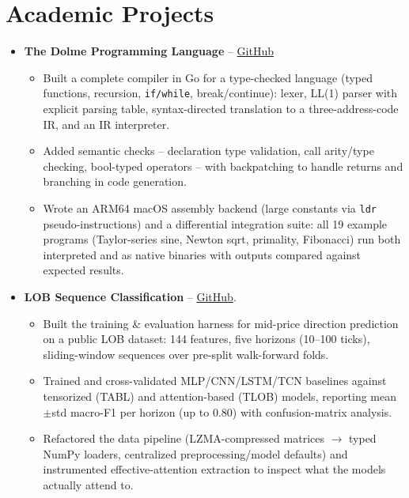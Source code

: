 \documentclass[12pt,a4paper]{article}
\begin{document}
\section{Academic Projects}
\begin{itemize}[label=\tiny$\bullet$, leftmargin=1em, itemsep=6pt]
    \item \textbf{The Dolme Programming Language}  -- \href{https://github.com/uidops/dolme}{GitHub}
    \begin{itemize}[label=--, topsep=1pt]
        \item Built a complete compiler in Go for a type-checked language (typed
            functions, recursion, \texttt{if/while}, break/continue): lexer, LL(1)
            parser with explicit parsing table, syntax-directed translation to a
            three-address-code IR, and an IR interpreter.
        \item Added semantic checks -- declaration type validation, call
            arity/type checking, bool-typed operators -- with backpatching to handle
            returns and branching in code generation.
        \item Wrote an ARM64 macOS assembly backend (large constants via
            \texttt{ldr} pseudo-instructions) and a differential integration suite:
            all 19 example programs (Taylor-series sine, Newton sqrt, primality,
            Fibonacci) run both interpreted and as native binaries with outputs
            compared against expected results.
    \end{itemize}

    \item \textbf{LOB Sequence Classification} -- \href{https://github.com/uidops}{GitHub}.
    \begin{itemize}
        \item Built the training \& evaluation harness for mid-price direction
            prediction on a public LOB dataset: 144 features, five horizons (10--100
            ticks), sliding-window sequences over pre-split walk-forward folds.
            \item Trained and cross-validated MLP/CNN/LSTM/TCN baselines against
            tensorized (TABL) and attention-based (TLOB) models, reporting
            mean$\pm$std macro-F1 per horizon (up to 0.80) with confusion-matrix
            analysis.
        \item Refactored the data pipeline (LZMA-compressed matrices $\rightarrow$
            typed NumPy loaders, centralized preprocessing/model defaults) and
            instrumented effective-attention extraction to inspect what the models
            actually attend to.
    \end{itemize}


\end{itemize}
\end{document}
